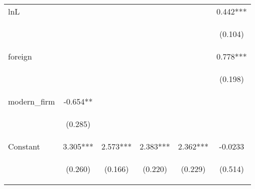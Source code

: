 \begin{center}
\begin{tabular}{lccccc}
lnL &  &  &  &  & 0.442*** \\
\vspace{4pt} & \begin{footnotesize}\end{footnotesize} & \begin{footnotesize}\end{footnotesize} & \begin{footnotesize}\end{footnotesize} & \begin{footnotesize}\end{footnotesize} & \begin{footnotesize}(0.104)\end{footnotesize} \\
foreign &  &  &  &  & 0.778*** \\
\vspace{4pt} & \begin{footnotesize}\end{footnotesize} & \begin{footnotesize}\end{footnotesize} & \begin{footnotesize}\end{footnotesize} & \begin{footnotesize}\end{footnotesize} & \begin{footnotesize}(0.198)\end{footnotesize} \\
modern\_firm & -0.654** &  &  &  &  \\
\vspace{4pt} & \begin{footnotesize}(0.285)\end{footnotesize} & \begin{footnotesize}\end{footnotesize} & \begin{footnotesize}\end{footnotesize} & \begin{footnotesize}\end{footnotesize} & \begin{footnotesize}\end{footnotesize} \\
Constant & 3.305*** & 2.573*** & 2.383*** & 2.362*** & -0.0233 \\
 & \begin{footnotesize}(0.260)\end{footnotesize} & \begin{footnotesize}(0.166)\end{footnotesize} & \begin{footnotesize}(0.220)\end{footnotesize} & \begin{footnotesize}(0.229)\end{footnotesize} & \begin{footnotesize}(0.514)\end{footnotesize} \\

\end{tabular}
\end{center}
